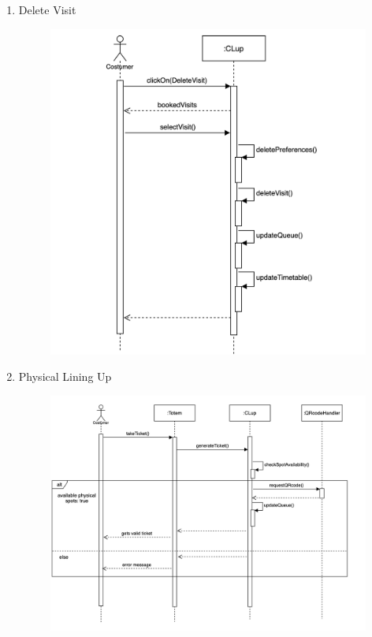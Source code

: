 \documentclass[]{article}
\begin{document}
\begin{enumerate}
						\item Delete Visit
							\begin{figure}[H]
								\centering
								\includegraphics[scale=0.6]{DeleteVisit.png}
								\caption{}
								\label{fig:deletevisit_sequencediagram}
							\end{figure}
							
						\item Physical Lining Up
							\begin{figure}[H]
								\centering
								\includegraphics[width=\linewidth]{PhysicalTicket.png}
								\caption{}
								\label{fig:physicalticket_sequencediagram}
							\end{figure}
						

\end{enumerate}
\end{document}
